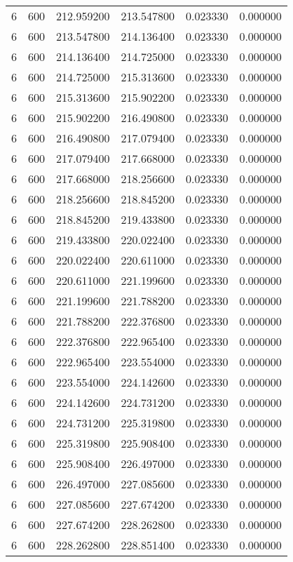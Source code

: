 \begin{longtable}{rrrrrr}
6 & 600 & 212.959200 & 213.547800 & 0.023330 & 0.000000 \\
6 & 600 & 213.547800 & 214.136400 & 0.023330 & 0.000000 \\
6 & 600 & 214.136400 & 214.725000 & 0.023330 & 0.000000 \\
6 & 600 & 214.725000 & 215.313600 & 0.023330 & 0.000000 \\
6 & 600 & 215.313600 & 215.902200 & 0.023330 & 0.000000 \\
6 & 600 & 215.902200 & 216.490800 & 0.023330 & 0.000000 \\
6 & 600 & 216.490800 & 217.079400 & 0.023330 & 0.000000 \\
6 & 600 & 217.079400 & 217.668000 & 0.023330 & 0.000000 \\
6 & 600 & 217.668000 & 218.256600 & 0.023330 & 0.000000 \\
6 & 600 & 218.256600 & 218.845200 & 0.023330 & 0.000000 \\
6 & 600 & 218.845200 & 219.433800 & 0.023330 & 0.000000 \\
6 & 600 & 219.433800 & 220.022400 & 0.023330 & 0.000000 \\
6 & 600 & 220.022400 & 220.611000 & 0.023330 & 0.000000 \\
6 & 600 & 220.611000 & 221.199600 & 0.023330 & 0.000000 \\
6 & 600 & 221.199600 & 221.788200 & 0.023330 & 0.000000 \\
6 & 600 & 221.788200 & 222.376800 & 0.023330 & 0.000000 \\
6 & 600 & 222.376800 & 222.965400 & 0.023330 & 0.000000 \\
6 & 600 & 222.965400 & 223.554000 & 0.023330 & 0.000000 \\
6 & 600 & 223.554000 & 224.142600 & 0.023330 & 0.000000 \\
6 & 600 & 224.142600 & 224.731200 & 0.023330 & 0.000000 \\
6 & 600 & 224.731200 & 225.319800 & 0.023330 & 0.000000 \\
6 & 600 & 225.319800 & 225.908400 & 0.023330 & 0.000000 \\
6 & 600 & 225.908400 & 226.497000 & 0.023330 & 0.000000 \\
6 & 600 & 226.497000 & 227.085600 & 0.023330 & 0.000000 \\
6 & 600 & 227.085600 & 227.674200 & 0.023330 & 0.000000 \\
6 & 600 & 227.674200 & 228.262800 & 0.023330 & 0.000000 \\
6 & 600 & 228.262800 & 228.851400 & 0.023330 & 0.000000 \\

\end{longtable}
